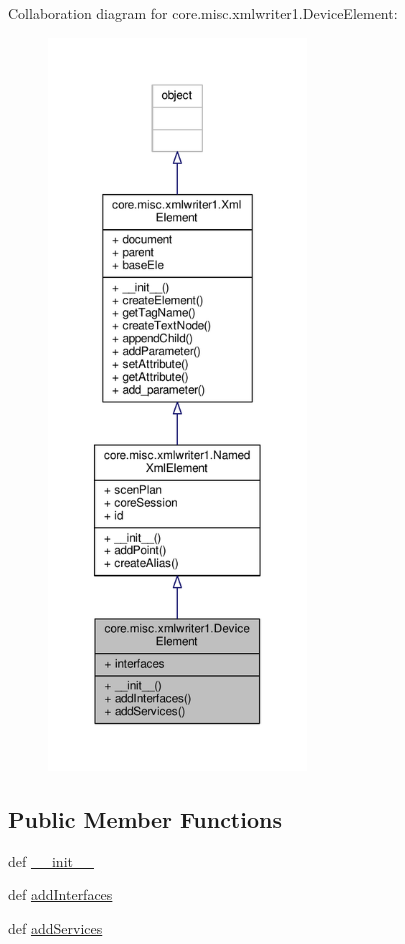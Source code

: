 Collaboration diagram for core.\+misc.\+xmlwriter1.\+Device\+Element\+:
\nopagebreak
\begin{figure}[H]
\begin{center}
\leavevmode
\includegraphics[height=550pt]{classcore_1_1misc_1_1xmlwriter1_1_1_device_element__coll__graph}
\end{center}
\end{figure}
\subsection*{Public Member Functions}
\begin{DoxyCompactItemize}
\item 
def \hyperlink{classcore_1_1misc_1_1xmlwriter1_1_1_device_element_abf1032bc362132d22dba8107b0750763}{\+\_\+\+\_\+init\+\_\+\+\_\+}
\item 
def \hyperlink{classcore_1_1misc_1_1xmlwriter1_1_1_device_element_a09ebef8d79fb1926641a15b135751393}{add\+Interfaces}
\item 
def \hyperlink{classcore_1_1misc_1_1xmlwriter1_1_1_device_element_aaa1da2ecfb57d9bf42d042c2a9e8d61f}{add\+Services}
\end{DoxyCompactItemize}
